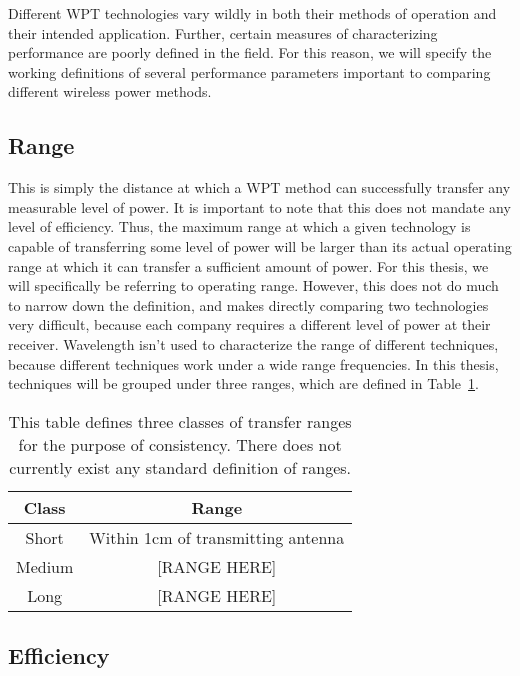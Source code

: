 Different WPT technologies vary wildly in both their methods of operation and their intended application.  Further, certain measures of characterizing performance are poorly defined in the field.  For this reason, we will specify the working definitions of several performance parameters important to comparing different wireless power methods.

\subsection{Range}

This is simply the distance at which a WPT method can successfully transfer any measurable level of power. It is important to note that this does not mandate any level of efficiency. Thus, the maximum range at which a given technology is capable of transferring some level of power will be larger than its actual operating range at which it can transfer a sufficient amount of power. For this thesis, we will specifically be referring to operating range. However, this does not do much to narrow down the definition, and makes directly comparing two technologies very difficult, because each company requires a different level of power at their receiver. Wavelength isn’t used to characterize the range of different techniques, because different techniques work under a wide range frequencies.  In this thesis, techniques will be grouped under three ranges, which are defined in Table~\ref{tab:lit-review-ranges}.

\def\arraystretch{2}
\begin{table}[t]
\centering
\begin{tabular}{|c|c|}
\hline
\textbf{Class} & \textbf{Range} \\ \hline
Short & Within 1cm of transmitting antenna \\ \hline
Medium & [RANGE HERE] \\ \hline
Long & [RANGE HERE] \\ \hline
\end{tabular}
\caption[Definition of transfer ranges]{This table defines three classes of transfer ranges for the purpose of consistency. There does not currently exist any standard definition of ranges.}
\label{tab:lit-review-ranges}
\end{table}

\subsection{Efficiency}

